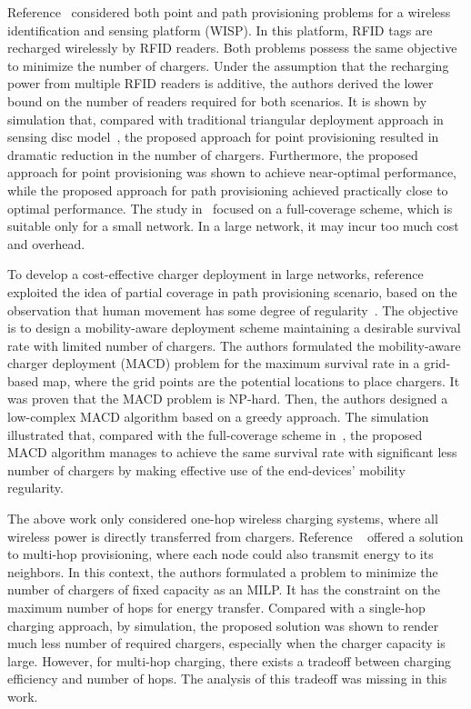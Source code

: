 \documentclass[twocolumn,10pt]{IEEEtran}
\begin{document}
Reference~\cite{S2013He} considered both point and path provisioning problems for a wireless identification and sensing platform (WISP). In this platform, RFID tags are recharged wirelessly by RFID readers. Both problems possess the same objective to minimize the number of chargers. Under the assumption that the recharging power from multiple RFID readers is additive, the authors derived the lower bound on the number of readers required for both scenarios. It is shown by simulation that, compared with traditional triangular deployment approach in sensing disc model~\cite{X.2006Bai}, the proposed approach for point provisioning resulted in dramatic reduction in the number of chargers. Furthermore, the proposed approach for point provisioning was shown to achieve near-optimal performance, while the proposed approach for path provisioning achieved practically close to optimal performance. The study in~\cite{S2013He} focused on a full-coverage scheme, which is suitable only for a small network. In a large network, it may incur too much cost and overhead.



To develop a cost-effective charger deployment in large networks, reference~\cite{C2012Chiu} exploited the idea of partial coverage in path provisioning scenario, based on the observation that human movement has some degree of regularity~\cite{C.2010Song}. The objective is to design a mobility-aware deployment scheme maintaining a desirable survival rate with limited number of chargers. The authors formulated the mobility-aware charger deployment (MACD) problem for the maximum survival rate in a grid-based map, where the grid points are the potential locations to place chargers. It was proven that the MACD problem is NP-hard. Then, the authors designed a low-complex MACD algorithm based on a greedy approach. The simulation illustrated that, compared with the full-coverage scheme in~\cite{S2013He}, the proposed MACD algorithm manages to achieve the same survival rate with significant less number of chargers by making effective use of the end-devices' mobility regularity. 

The above work only considered one-hop wireless charging systems, where all wireless power is directly transferred from chargers. Reference ~\cite{T2013Rault} offered a solution to multi-hop provisioning, where each node could also transmit energy to its neighbors. In this context, the authors formulated a problem to minimize the number of chargers of fixed capacity as an MILP. It has the constraint on the maximum number of hops for energy transfer. Compared with a single-hop charging approach, by simulation, the proposed solution was shown to render much less number of required chargers, especially when the charger capacity is large. However, for multi-hop charging, there exists a tradeoff between charging efficiency and number of hops. The analysis of this tradeoff was missing in this work. 
\end{document}
